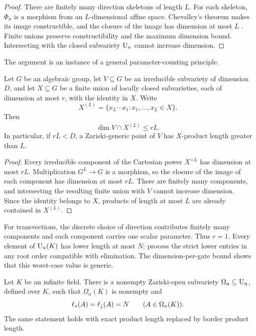 \begin{proof}
There are finitely many direction skeletons of length $L$.  For each skeleton, $\Phi_\sigma$ is a morphism from an $L$-dimensional affine space.  Chevalley's theorem makes its image constructible, and the closure of the image has dimension at most $L$ \cite{g:Hartshorne1977}.  Finite unions preserve constructibility and the maximum dimension bound.  Intersecting with the closed subvariety $\operatorname{U}_n$ cannot increase dimension.
\end{proof}

The argument is an instance of a general parameter-counting principle.

\begin{proposition}\label{g:prop:dimension-per-gate}
Let $G$ be an algebraic group, let $V\subseteq G$ be an irreducible subvariety of dimension $D$, and let $X\subseteq G$ be a finite union of locally closed subvarieties, each of dimension at most $r$, with the identity in $X$.  Write
\[
X^{(L)}
=
\{x_L\cdots x_1:x_1,\ldots,x_L\in X\}.
\]
Then
\[
\dim\overline{V\cap X^{(L)}}\le rL.
\]
In particular, if $rL<D$, a Zariski-generic point of $V$ has $X$-product length greater than $L$.
\end{proposition}

\begin{proof}
Every irreducible component of the Cartesian power $X^{\times L}$ has dimension at most $rL$.  Multiplication $G^L\to G$ is a morphism, so the closure of the image of each component has dimension at most $rL$.  There are finitely many components, and intersecting the resulting finite union with $V$ cannot increase dimension.  Since the identity belongs to $X$, products of length at most $L$ are already contained in $X^{(L)}$.
\end{proof}

For transvections, the discrete choice of direction contributes finitely many components and each component carries one scalar parameter.  Thus $r=1$.  Every element of $\operatorname{U}_n(K)$ has lower length at most $N$: process the strict lower entries in any root order compatible with elimination.  The dimension-per-gate bound shows that this worst-case value is generic.

\begin{theorem}\label{g:thm:generic-rigidity}
Let $K$ be an infinite field.  There is a nonempty Zariski-open subvariety $\Omega_n\subseteq\operatorname{U}_n$, defined over $K$, such that $\Omega_n(K)$ is nonempty and
\[
\ell_{*}(A)=\ell_{\downarrow}(A)=N
\qquad(A\in\Omega_n(K)).
\]
The same statement holds with exact product length replaced by border product length.
\end{theorem}

